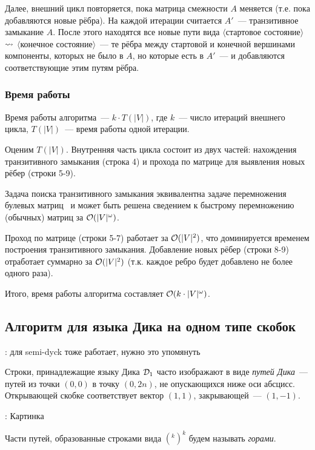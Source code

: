 Далее, внешний цикл повторяется, пока матрица смежности $A$ меняется (т.е. пока добавляются новые рёбра). На каждой итерации считается $A'$~--- транзитивное замыкание $A$. После этого находятся все новые пути вида $\langle$стартовое состояние$\rangle$ $\rightsquigarrow$ $\langle$конечное состояние$\rangle$~--- те рёбра между стартовой и конечной вершинами компоненты, которых не было в $A$, но которые есть в $A'$~--- и добавляются соответствующие этим путям рёбра.

\subsubsection*{Время работы}

Время работы алгоритма~--- $k \cdot T(|V|)$, где $k$~--- число итераций внешнего цикла, $T(|V|)$~--- время работы одной итерации. 

Оценим $T(|V|)$. Внутренняя часть цикла состоит из двух частей: нахождения транзитивного замыкания (строка 4) и прохода по матрице для выявления новых рёбер (строки 5-9). 

Задача поиска транзитивного замыкания эквивалентна задаче перемножения булевых матриц~\cite{Aho1974} и может быть решена сведением к быстрому перемножению (обычных) матриц за $\mathcal{O}(|V|^\omega)$.

Проход по матрице (строки 5-7) работает за $\mathcal{O}(|V|^2)$, что доминируется временем построения транзитивного замыкания. Добавление новых рёбер (строки 8-9) отработает суммарно за $\mathcal{O}(|V|^2)$ (т.к. каждое ребро будет добавлено не более одного раза).

Итого, время работы алгоритма составляет $\mathcal{O}(k \cdot |V|^{\omega})$.

\subsection{Алгоритм для языка Дика на одном типе скобок}

\TODO: для semi-dyck тоже работает, нужно это упомянуть

\begin{definition}\label{def:dyck_paths}
  Строки, принадлежащие языку Дика $\mathcal{D}_1$ часто изображают в виде \textit{путей Дика}~--- путей из точки $(0, 0)$ в точку $(0, 2n)$, не опускающихся ниже оси абсцисс. Открывающей скобке соответствует вектор $(1, 1)$, закрывающей~--- $(1, -1)$.

  \TODO: Картинка 

  Части путей, образованные строками вида $(^k )^k$ будем называть \textit{горами}.

\end{definition}

